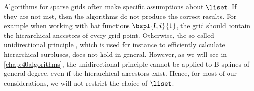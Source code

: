Algorithms for sparse grids often make specific assumptions about $\liset$.
If they are not met, then the algorithms do not produce the correct results.
For example when working with hat functions $\bspl{\*l,\*i}{1}$,
the grid should contain the hierarchical ancestors of every grid point.
Otherwise, the so-called unidirectional principle \cite{Balder94Adaptive},
which is used for instance to efficiently calculate
hierarchical surpluses, does not hold in general.
However, as we will see in \cref{chap:40algorithms},
the unidirectional principle cannot be applied
to B-splines of general degree, even if the hierarchical ancestors exist.
Hence, for most of our considerations, we will not restrict the
choice of $\liset$.
